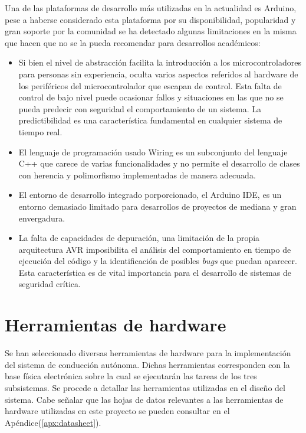     Una de las plataformas de desarrollo más utilizadas en la actualidad es Arduino, pese a haberse considerado esta plataforma 
    por su disponibilidad, popularidad y gran soporte por la comunidad se ha detectado algunas limitaciones en la misma 
    que hacen que no se la pueda recomendar para desarrollos académicos:

    \begin{itemize}
        \item Si bien el nivel de abstracción facilita la introducción a los microcontroladores para personas 
        sin experiencia, oculta varios aspectos referidos al hardware de los periféricos del microcontrolador que 
        escapan de control. Esta falta de control de bajo nivel puede ocasionar fallos y situaciones en las que no 
        se pueda predecir con seguridad el comportamiento de un sistema. La predictibilidad es una característica 
        fundamental en cualquier sistema de tiempo real.

        \item El lenguaje de programación usado Wiring es un subconjunto del lenguaje C++ que carece de varias 
        funcionalidades y no permite el desarrollo de clases con herencia y polimorfismo implementadas de manera adecuada.

        \item El entorno de desarrollo integrado porporcionado, el Arduino IDE, es un entorno demasiado limitado 
        para desarrollos de proyectos de mediana y gran envergadura.

        \item La falta de capacidades de depuración, una limitación de la propia arquitectura AVR imposibilita el 
        análisis del comportamiento en tiempo de ejecución del código y la identificación de posibles \textit{bugs} 
        que puedan aparecer. Esta característica es de vital importancia para el desarrollo de sistemas de seguridad crítica.

    \end{itemize}


\section{Herramientas de hardware}\label{sec:hardware}
Se han seleccionado diversas herramientas de hardware para la implementación del sistema de conducción autónoma. Dichas herramientas
corresponden con la base física electrónica sobre la cual se ejecutarán las tareas de los tres subsistemas. Se procede a detallar 
las herramientas utilizadas en el diseño del sistema. Cabe señalar que las hojas de datos relevantes a las herramientas de hardware 
utilizadas en este proyecto se pueden consultar en el Apéndice(\ref{apx:datasheet}).

